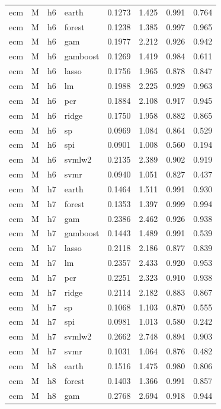 \begin{ThreePartTable}
\begin{longtable}[t]{llclcccc}
\addlinespace
ecm & M & h6 & earth & 0.1273 & 1.425 & 0.991 & 0.764\\
ecm & M & h6 & forest & 0.1238 & 1.385 & 0.997 & 0.965\\
ecm & M & h6 & gam & 0.1977 & 2.212 & 0.926 & 0.942\\
ecm & M & h6 & gamboost & 0.1269 & 1.419 & 0.984 & 0.611\\
ecm & M & h6 & lasso & 0.1756 & 1.965 & 0.878 & 0.847\\
ecm & M & h6 & lm & 0.1988 & 2.225 & 0.929 & 0.963\\
ecm & M & h6 & pcr & 0.1884 & 2.108 & 0.917 & 0.945\\
ecm & M & h6 & ridge & 0.1750 & 1.958 & 0.882 & 0.865\\
ecm & M & h6 & sp & 0.0969 & 1.084 & 0.864 & 0.529\\
ecm & M & h6 & spi & 0.0901 & 1.008 & 0.560 & 0.194\\
ecm & M & h6 & svmlw2 & 0.2135 & 2.389 & 0.902 & 0.919\\
ecm & M & h6 & svmr & 0.0940 & 1.051 & 0.827 & 0.437\\
\addlinespace
ecm & M & h7 & earth & 0.1464 & 1.511 & 0.991 & 0.930\\
ecm & M & h7 & forest & 0.1353 & 1.397 & 0.999 & 0.994\\
ecm & M & h7 & gam & 0.2386 & 2.462 & 0.926 & 0.938\\
ecm & M & h7 & gamboost & 0.1443 & 1.489 & 0.991 & 0.539\\
ecm & M & h7 & lasso & 0.2118 & 2.186 & 0.877 & 0.839\\
ecm & M & h7 & lm & 0.2357 & 2.433 & 0.920 & 0.953\\
ecm & M & h7 & pcr & 0.2251 & 2.323 & 0.910 & 0.938\\
ecm & M & h7 & ridge & 0.2114 & 2.182 & 0.883 & 0.867\\
ecm & M & h7 & sp & 0.1068 & 1.103 & 0.870 & 0.555\\
ecm & M & h7 & spi & 0.0981 & 1.013 & 0.580 & 0.242\\
ecm & M & h7 & svmlw2 & 0.2662 & 2.748 & 0.894 & 0.903\\
ecm & M & h7 & svmr & 0.1031 & 1.064 & 0.876 & 0.482\\
\addlinespace
ecm & M & h8 & earth & 0.1516 & 1.475 & 0.980 & 0.806\\
ecm & M & h8 & forest & 0.1403 & 1.366 & 0.991 & 0.857\\
ecm & M & h8 & gam & 0.2768 & 2.694 & 0.918 & 0.944\\

\end{longtable}
\end{ThreePartTable}
